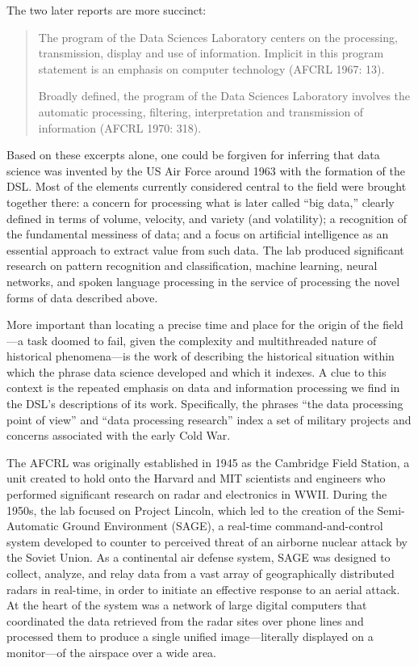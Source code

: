 \documentclass[
  letterpaper,
]{report}
\begin{document}
The two later reports are more succinct:

\begin{quote}
The program of the Data Sciences Laboratory centers on the processing,
transmission, display and use of information. Implicit in this program
statement is an emphasis on computer technology (AFCRL 1967: 13).

Broadly defined, the program of the Data Sciences Laboratory involves
the automatic processing, filtering, interpretation and transmission of
information (AFCRL 1970: 318).
\end{quote}

Based on these excerpts alone, one could be forgiven for inferring that
data science was invented by the US Air Force around 1963 with the
formation of the DSL. Most of the elements currently considered central
to the field were brought together there: a concern for processing what
is later called ``big data,'' clearly defined in terms of volume,
velocity, and variety (and volatility); a recognition of the fundamental
messiness of data; and a focus on artificial intelligence as an
essential approach to extract value from such data. The lab produced
significant research on pattern recognition and classification, machine
learning, neural networks, and spoken language processing in the service
of processing the novel forms of data described above.

More important than locating a precise time and place for the origin of
the field---a task doomed to fail, given the complexity and
multithreaded nature of historical phenomena---is the work of describing
the historical situation within which the phrase data science developed
and which it indexes. A clue to this context is the repeated emphasis on
data and information processing we find in the DSL's descriptions of its
work. Specifically, the phrases ``the data processing point of view''
and ``data processing research'' index a set of military projects and
concerns associated with the early Cold War.

The AFCRL was originally established in 1945 as the Cambridge Field
Station, a unit created to hold onto the Harvard and MIT scientists and
engineers who performed significant research on radar and electronics in
WWII. During the 1950s, the lab focused on Project Lincoln, which led to
the creation of the Semi-Automatic Ground Environment (SAGE), a
real-time command-and-control system developed to counter to perceived
threat of an airborne nuclear attack by the Soviet Union. As a
continental air defense system, SAGE was designed to collect, analyze,
and relay data from a vast array of geographically distributed radars in
real-time, in order to initiate an effective response to an aerial
attack. At the heart of the system was a network of large digital
computers that coordinated the data retrieved from the radar sites over
phone lines and processed them to produce a single unified
image---literally displayed on a monitor---of the airspace over a wide
area.
\end{document}
